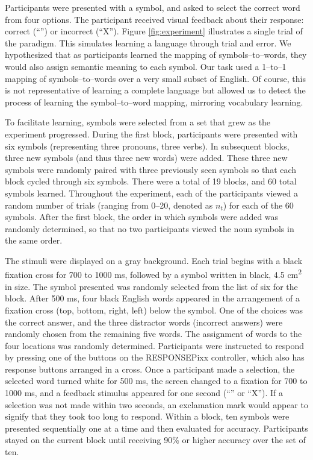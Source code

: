 Participants were presented with a symbol, and asked to select the correct word 
from four options. The participant received visual feedback about their 
response: correct (``\CheckmarkBold'') or incorrect (``X''). Figure 
\ref{fig:experiment} illustrates a single trial of the paradigm. This simulates 
learning a language through trial and error. We hypothesized that as 
participants learned the mapping of symbols--to--words, they would also assign 
semantic meaning to each symbol. Our task used a 1--to--1 mapping of 
symbols--to--words over a very small subset of English. Of course, this is not 
representative of learning a complete language but allowed us to detect the 
process of learning the symbol--to--word mapping, mirroring vocabulary 
learning.

To facilitate learning, symbols were selected from a set that grew as the 
experiment progressed. During the first block, participants were presented with 
six symbols (representing three pronouns, three verbs). In subsequent blocks, 
three new symbols (and thus three new words) were added. These three new 
symbols were randomly paired with three previously seen symbols so that each 
block cycled through six symbols. There were a total of 19 blocks, and 60 total 
symbols learned. Throughout the experiment, each of the participants viewed a 
random number of trials (ranging from 0--20, denoted as $n_t$) for each of the 
60 symbols. After the first block, the order in which symbols were added was 
randomly determined, so that no two participants viewed the noun symbols in the 
same order.
  
The stimuli were displayed on a gray background.  Each trial begins with a 
black fixation cross for 700 to 1000 ms, followed by a symbol written in black, 
4.5 cm\textsuperscript{2} in size. The symbol presented was randomly selected 
from the list of six for the block. After 500 ms, four black English words 
appeared in the arrangement of a fixation cross (top, bottom, right, left) 
below the symbol. One of the choices was the correct answer, and the three 
distractor words (incorrect answers) were randomly chosen from the remaining 
five words. The assignment of words to the four locations was randomly 
determined. Participants were instructed to respond by pressing one of the 
buttons on the RESPONSEPixx controller, which also has response buttons 
arranged in a cross. Once a participant made a selection, the selected word 
turned white for 500 ms, the screen changed to a fixation for 700 to 1000 ms, 
and a feedback stimulus appeared for one second (``\CheckmarkBold'' or ``X'').  
If a selection was not made within two seconds, an exclamation mark would 
appear to signify that they took too long to respond. Within a block, ten 
symbols were presented sequentially one at a time and then evaluated for 
accuracy. Participants stayed on the current block until receiving 90\% or 
higher accuracy over the set of ten.
  
